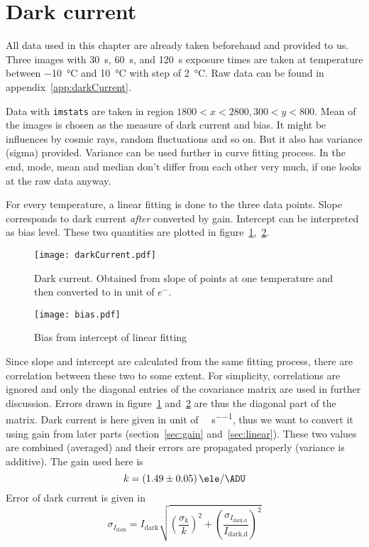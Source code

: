 \clearpage
\section{Dark current}
All data used in this chapter are already taken beforehand and provided to us. Three images with \SI{30}{\s}, \SI{60}{\s}, and \SI{120}{\s} exposure times are taken at temperature between \SI{-10}{\degreeCelsius} and \SI{10}{\degreeCelsius} with step of \SI{2}{\degreeCelsius}. Raw data can be found in appendix~\ref{app:darkCurrent}.

Data with \verb|imstats| are taken in region $1800 < x < 2800, 300 < y < 800$. Mean of the images is chosen as the measure of dark current and bias. It might be influences by cosmic rays, random fluctuations and so on. But it also has variance (sigma) provided. Variance can be used further in curve fitting process. In the end, mode, mean and median don't differ from each other very much, if one looks at the raw data anyway.

For every temperature, a linear fitting is done to the three data points. Slope corresponds to dark current \textit{after} converted by gain. Intercept can be interpreted as bias level. These two quantities are plotted in figure~\ref{fig:darkCurrent},~\ref{fig:bias}.
\begin{figure}[ht]
	\centering
	\texttt{[image: darkCurrent.pdf]}
	\caption{Dark current. Obtained from slope of points at one temperature and then converted to in unit of $e^-$.}%
	\label{fig:darkCurrent}
\end{figure}
\begin{figure}[ht]
	\centering
	\texttt{[image: bias.pdf]}
	\caption{Bias from intercept of linear fitting}%
	\label{fig:bias}
\end{figure}

Since slope and intercept are calculated from the same fitting process, there are correlation between these two to some extent. For simplicity, correlations are ignored and only the diagonal entries of the covariance matrix are used in further discussion. Errors drawn in figure~\ref{fig:darkCurrent} and~\ref{fig:bias} are thus the diagonal part of the matrix. Dark current is here given in unit of \si{\ele\per\px\per\s}, thus we want to convert it using gain from later parts (section~\ref{sec:gain} and~\ref{sec:linear}). These two values are combined (averaged) and their errors are propagated properly (variance is additive). The gain used here is
\begin{equation*}
	k = \SI{1.49 +- 0.05}{\ele\per\ADU}
\end{equation*}
Error of dark current is given in
\begin{equation*}
	\sigma_{I_\text{dark}} = I_\text{dark} \sqrt{ \left( \frac{\sigma_k}{k} \right)^2 + \left( \frac{\sigma_{I_{\text{dark,d}}}}{I_{\text{dark,d}}} \right)^2  }	
\end{equation*}

